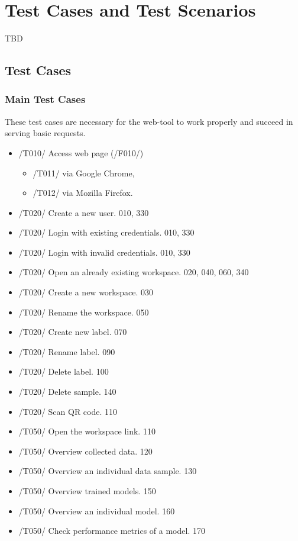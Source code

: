 \section{Test Cases and Test Scenarios}
TBD
\subsection{Test Cases}
\subsubsection{Main Test Cases}
These test cases are necessary for the web-tool to work properly and succeed in serving
basic requests.

\begin{itemize}
    \item /T010/ Access web page (/F010/)
    \begin{itemize}
        \item /T011/ via Google Chrome,
        \item /T012/ via Mozilla Firefox.
    \end{itemize}
    \item /T020/ Create a new user. 010, 330
    \item /T020/ Login with existing credentials. 010, 330
    \item /T020/ Login with invalid credentials. 010, 330
    \item /T020/ Open an already existing workspace. 020, 040, 060, 340
    \item /T020/ Create a new workspace. 030
    \item /T020/ Rename the workspace. 050
    \item /T020/ Create new label. 070
    \item /T020/ Rename label. 090
    \item /T020/ Delete label. 100
    \item /T020/ Delete sample. 140
    \item /T020/ Scan QR code. 110
    \item /T050/ Open the workspace link. 110
    \item /T050/ Overview collected data. 120
    \item /T050/ Overview an individual data sample. 130
    \item /T050/ Overview trained models. 150
    \item /T050/ Overview an individual model. 160
    \item /T050/ Check performance metrics of a model. 170

\end{itemize}
